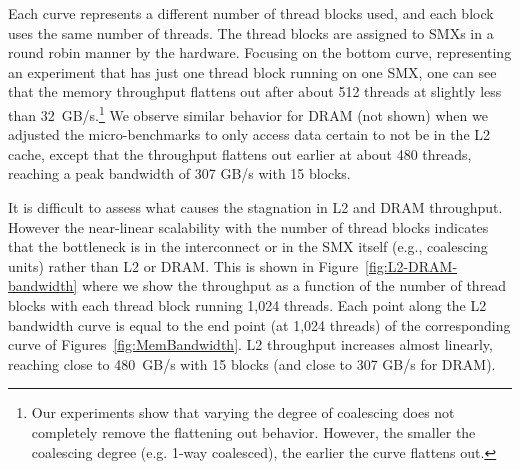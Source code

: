 

Each curve represents a different number of thread blocks used, and each block uses the same number of threads.
The thread blocks are assigned to SMXs in a round robin manner by the hardware.
Focusing on the bottom curve, representing an experiment that has just one thread block running on
one SMX, one can see that the memory throughput flattens out after about 512 threads at slightly less
than 32~GB/s.\footnote{
    Our experiments show that varying the degree of coalescing does not completely
    remove the flattening out behavior. 
    However, the smaller the coalescing degree (e.g. 1-way coalesced), the
    earlier the curve flattens out.}
We observe similar behavior for DRAM (not shown) when we adjusted the micro-benchmarks to only access data certain to not be in the L2 cache, except that the throughput flattens out
earlier at about 480 threads, reaching a peak bandwidth of 307 GB/s with 15 blocks.


It is difficult to assess what causes the stagnation in L2 and DRAM throughput.
However the near-linear scalability with the number of thread blocks indicates that the bottleneck
is in the interconnect or in the SMX itself (e.g., coalescing units) rather than L2 or DRAM.
This is shown in Figure~\ref{fig:L2-DRAM-bandwidth} where we show the throughput as a function of
the number of thread blocks with each thread block running 1,024 threads.
Each point along the L2 bandwidth curve is equal to the end point (at 1,024 threads) of the corresponding curve of
Figures~\ref{fig:MemBandwidth}.
L2 throughput increases almost linearly, reaching close to 480~GB/s with 15 blocks (and close to 307 GB/s for DRAM).

